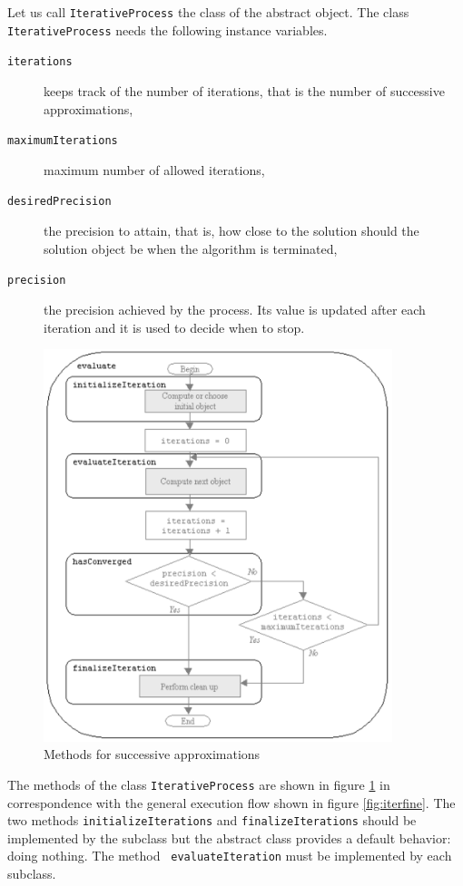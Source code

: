 \documentclass[twoside]{book}
\begin{document}
Let us call {\tt IterativeProcess} the class of the abstract
object. The class {\tt IterativeProcess} needs the following
instance variables.
\begin{description}
\item[{\tt iterations}] keeps track of the number of iterations, that is the number of successive
approximations,
\item[{\tt maximumIterations}] maximum number of allowed iterations,
\item[{\tt desiredPrecision}] the precision to attain, that is, how close to the solution should the solution object be when the algorithm is
terminated,
\item[{\tt precision}] the precision achieved by the process. Its value is updated after each iteration and it is used to decide when to stop.
\end{description}
\begin{figure}
\centering\includegraphics[width=4in]{Figures/IterationMethods}
\caption{Methods for successive
approximations}\label{fig:itermeth}
\end{figure}
The methods of the class {\tt IterativeProcess} are shown in
figure \ref{fig:itermeth} in correspondence with the general
execution flow shown in figure \ref{fig:iterfine}. The two methods
{\tt initializeIterations} and {\tt finalizeIterations} should be
implemented by the subclass but the abstract class provides a
default behavior: doing nothing. The method {\tt
evaluateIteration} must be implemented by each subclass.
\end{document}

